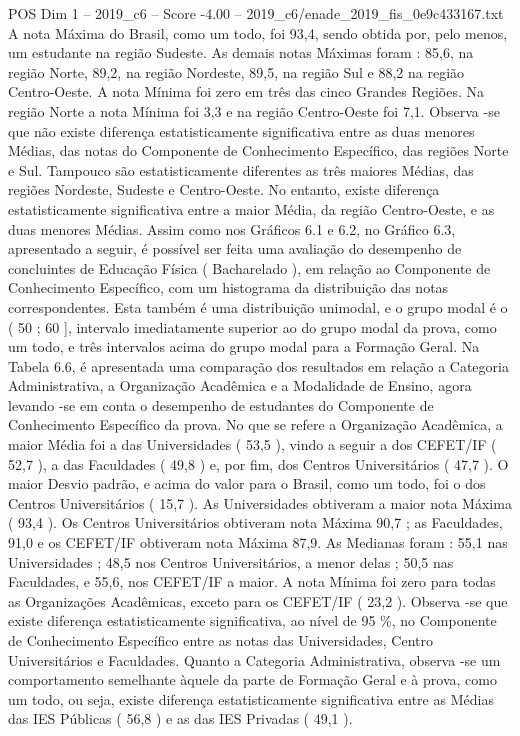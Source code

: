 \begin{textsample}{POS Dim 1 – 2019\_c6 – Score -4.00 – 2019\_c6/enade\_2019\_fis\_0e9c433167.txt}
A nota Máxima do Brasil, como um todo, foi 93,4, sendo obtida por, pelo menos, um estudante na região Sudeste.
As demais notas Máximas foram : 85,6, na região Norte, 89,2, na região Nordeste, 89,5, na região Sul e 88,2 na região Centro-Oeste.
A nota Mínima foi zero em três das cinco Grandes Regiões.
Na região Norte a nota Mínima foi 3,3 e na região Centro-Oeste foi 7,1.
Observa -se que não existe diferença estatisticamente significativa entre as duas menores Médias, das notas do Componente de Conhecimento Específico, das regiões Norte e Sul.
Tampouco são estatisticamente diferentes as três maiores Médias, das regiões Nordeste, Sudeste e Centro-Oeste.
No entanto, existe diferença estatisticamente significativa entre a maior Média, da região Centro-Oeste, e as duas menores Médias.
Assim como nos Gráficos 6.1 e 6.2, no Gráfico 6.3, apresentado a seguir, é possível ser feita uma avaliação do desempenho de concluintes de Educação Física ( Bacharelado ), em relação ao Componente de Conhecimento Específico, com um histograma da distribuição das notas correspondentes.
Esta também é uma distribuição unimodal, e o grupo modal é o ( 50 ; 60 ], intervalo imediatamente superior ao do grupo modal da prova, como um todo, e três intervalos acima do grupo modal para a Formação Geral.
Na Tabela 6.6, é apresentada uma comparação dos resultados em relação a Categoria Administrativa, a Organização Acadêmica e a Modalidade de Ensino, agora levando -se em conta o desempenho de estudantes do Componente de Conhecimento Específico da prova.
No que se refere a Organização Acadêmica, a maior Média foi a das Universidades ( 53,5 ), vindo a seguir a dos CEFET/IF ( 52,7 ), a das Faculdades ( 49,8 ) e, por fim, dos Centros Universitários ( 47,7 ).
O maior Desvio padrão, e acima do valor para o Brasil, como um todo, foi o dos Centros Universitários ( 15,7 ).
As Universidades obtiveram a maior nota Máxima ( 93,4 ).
Os Centros Universitários obtiveram nota Máxima 90,7 ; as Faculdades, 91,0 e os CEFET/IF obtiveram nota Máxima 87,9.
As Medianas foram : 55,1 nas Universidades ; 48,5 nos Centros Universitários, a menor delas ; 50,5 nas Faculdades, e 55,6, nos CEFET/IF a maior.
A nota Mínima foi zero para todas as Organizações Acadêmicas, exceto para os CEFET/IF ( 23,2 ).
Observa -se que existe diferença estatisticamente significativa, ao nível de 95 \%, no Componente de Conhecimento Específico entre as notas das Universidades, Centro Universitários e Faculdades.
Quanto a Categoria Administrativa, observa -se um comportamento semelhante àquele da parte de Formação Geral e à prova, como um todo, ou seja, existe diferença estatisticamente significativa entre as Médias das IES Públicas ( 56,8 ) e as das IES Privadas ( 49,1 ).

\end{textsample}
